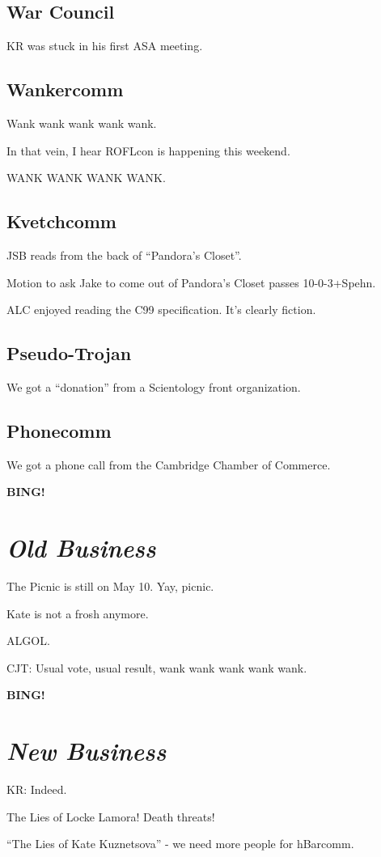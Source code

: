 \documentclass[10pt]{article}
\newcommand{\bing}{{\bf BING!} }
\newcommand{\goto}[1]{\bing \vskip 12pt \section*{{\em{#1}}}}
\begin{document}
\subsection*{War Council}

KR was stuck in his first ASA meeting.

\subsection*{Wankercomm}

Wank wank wank wank wank.

In that vein, I hear ROFLcon is happening this weekend.

WANK WANK WANK WANK.

\subsection*{Kvetchcomm}

JSB reads from the back of ``Pandora's Closet''.

Motion to ask Jake to come out of Pandora's Closet passes 10-0-3+Spehn.

ALC enjoyed reading the C99 specification.  It's clearly fiction.

\subsection*{Pseudo-Trojan}

We got a ``donation'' from a Scientology front organization.

\subsection*{Phonecomm}

We got a phone call from the Cambridge Chamber of Commerce.

\goto{Old Business}

The Picnic is still on May 10.  Yay, picnic.

Kate is not a frosh anymore.

ALGOL.

CJT: Usual vote, usual result, wank wank wank wank wank.

\goto{New Business}

KR: Indeed.

The Lies of Locke Lamora!  Death threats!

``The Lies of Kate Kuznetsova'' - we need more people for hBarcomm.
\end{document}
